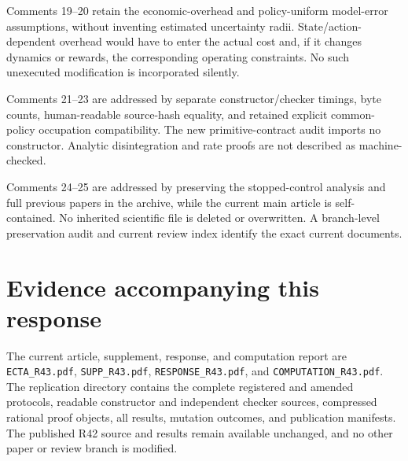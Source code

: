 Comments 19--20 retain the economic-overhead and policy-uniform model-error assumptions, without inventing estimated uncertainty radii. State/action-dependent overhead would have to enter the actual cost and, if it changes dynamics or rewards, the corresponding operating constraints. No such unexecuted modification is incorporated silently.

Comments 21--23 are addressed by separate constructor/checker timings, byte counts, human-readable source-hash equality, and retained explicit common-policy occupation compatibility. The new primitive-contract audit imports no constructor. Analytic disintegration and rate proofs are not described as machine-checked.

Comments 24--25 are addressed by preserving the stopped-control analysis and full previous papers in the archive, while the current main article is self-contained. No inherited scientific file is deleted or overwritten. A branch-level preservation audit and current review index identify the exact current documents.

\section{Evidence accompanying this response}
The current article, supplement, response, and computation report are \texttt{ECTA\_R43.pdf}, \texttt{SUPP\_R43.pdf}, \texttt{RESPONSE\_R43.pdf}, and \texttt{COMPUTATION\_R43.pdf}. The replication directory contains the complete registered and amended protocols, readable constructor and independent checker sources, compressed rational proof objects, all results, mutation outcomes, and publication manifests. The published R42 source and results remain available unchanged, and no other paper or review branch is modified.

